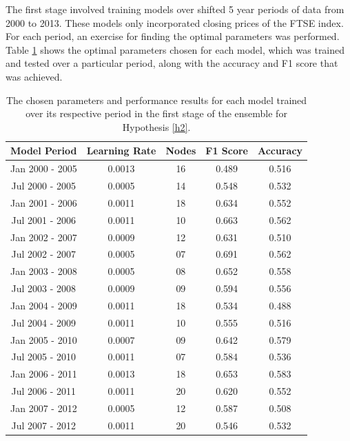 \documentclass{UoYCSproject}
\begin{document}
The first stage involved training models over shifted 5 year periods of data from 2000 to 2013. These models only incorporated closing prices of the FTSE index. For each period, an exercise for finding the optimal parameters was performed. Table \ref{tab:h2_stage1} shows the optimal parameters chosen for each model, which was trained and tested over a particular period, along with the accuracy and F1 score that was achieved. 
\begin{table}[h]
    \centering
    \begin{tabular}{|c|c|c|c|c|} \hline
        \textbf{Model Period} & \textbf{Learning Rate} & \textbf{Nodes} & \textbf{F1 Score} & \textbf{Accuracy} \\ \hline
        Jan 2000 - 2005 & 0.0013 & 16 & 0.489 & 0.516 \\
        Jul 2000 - 2005 & 0.0005 & 14 & 0.548 & 0.532 \\
        Jan 2001 - 2006 & 0.0011 & 18 & 0.634 & 0.552 \\
        Jul 2001 - 2006 & 0.0011 & 10 & 0.663 & 0.562 \\
        Jan 2002 - 2007 & 0.0009 & 12 & 0.631 & 0.510 \\
        Jul 2002 - 2007 & 0.0005 & 07 & 0.691 & 0.562 \\
        Jan 2003 - 2008 & 0.0005 & 08 & 0.652 & 0.558 \\
        Jul 2003 - 2008 & 0.0009 & 09 & 0.594 & 0.556 \\
        Jan 2004 - 2009 & 0.0011 & 18 & 0.534 & 0.488 \\
        Jul 2004 - 2009 & 0.0011 & 10 & 0.555 & 0.516 \\
        Jan 2005 - 2010 & 0.0007 & 09 & 0.642 & 0.579 \\
        Jul 2005 - 2010 & 0.0011 & 07 & 0.584 & 0.536 \\
        Jan 2006 - 2011 & 0.0013 & 18 & 0.653 & 0.583 \\
        Jul 2006 - 2011 & 0.0011 & 20 & 0.620 & 0.552 \\
        Jan 2007 - 2012 & 0.0005 & 12 & 0.587 & 0.508 \\
        Jul 2007 - 2012 & 0.0011 & 20 & 0.546 & 0.532 \\
        \hline
    \end{tabular}
    \caption{The chosen parameters and performance results for each model trained over its respective period in the first stage of the ensemble for Hypothesis \ref{h2}.}
    \label{tab:h2_stage1}
\end{table}
\end{document}
